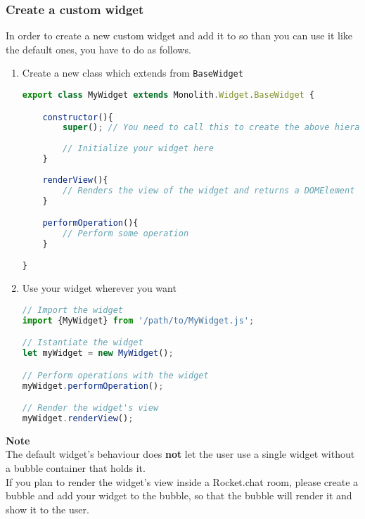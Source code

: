 \subsubsection{Create a custom widget}
In order to create a new custom widget and add it to  so than you can use it like the default ones, you have to do as follows.
\begin{enumerate}

	\item Create a new class which extends from \texttt{BaseWidget}
\begin{lstlisting}[language=JavaScript]
export class MyWidget extends Monolith.Widget.BaseWidget {

    constructor(){
        super(); // You need to call this to create the above hierarchy
        
        // Initialize your widget here
    }
    
    renderView(){
        // Renders the view of the widget and returns a DOMElement object
    }

    performOperation(){
        // Perform some operation
    }

}
\end{lstlisting}

	\item Use your widget wherever you want
\begin{lstlisting}[language=JavaScript]
// Import the widget
import {MyWidget} from '/path/to/MyWidget.js';

// Istantiate the widget
let myWidget = new MyWidget();

// Perform operations with the widget
myWidget.performOperation();

// Render the widget's view
myWidget.renderView();
\end{lstlisting}
  
\end{enumerate}  
  
\textbf{Note} \\ 
The default widget's behaviour does \textbf{not} let the user use a single widget without a bubble container that holds it. \\
If you plan to render the widget's view inside a Rocket.chat room, please create a bubble and add your widget to the bubble, so that the bubble will render it and show it to the user.

\newpage

